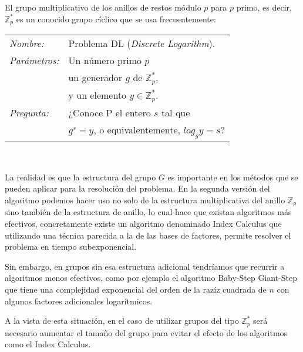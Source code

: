 \hfil

El grupo multiplicativo de los anillos de restos m\'odulo $p$ para $p$ primo, es decir, ${\mathbb Z}^*_p$ es un conocido grupo c\'iclico que se usa frecuentemente:

\hfil

\begin{tabular}{|ll}
	\textit{Nombre:} & Problema DL (\textit{Discrete Logarithm}). \\
	\textit{Parámetros:} & Un n\'umero primo $p$ \\ & un generador $g$ de ${\mathbb Z}_p^*$,\\ & y un elemento $y\in {\mathbb Z}_p^*$. \\
	\textit{Pregunta:} & ¿Conoce P el entero $s$ tal que \\ & $g^s = y$, o equivalentemente, $log_g y = s$? \\
\end{tabular}
\\

\hfil

La realidad es que la estructura del grupo $G$ es importante en los m\'etodos que se pueden aplicar para la resoluci\'on del problema. En la segunda versi\'on del algoritmo
podemos hacer uso no solo de la estructura multiplicativa del anillo ${\mathbb Z}_p$ sino tambi\'en de la estructura de anillo, lo cual hace que existan algoritmos m\'as efectivos,
concretamente existe un algoritmo denominado Index Calculus que utilizando una t\'ecnica parecida a la de las bases de factores, permite resolver el problema en tiempo subexponencial.

Sin embargo, en grupos sin esa estructura adicional tendr\'iamos que recurrir a algoritmos menos efectivos, como por ejemplo el algoritmo Baby-Step Giant-Step que tiene una complejidad
exponencial del orden de la raz\'iz cuadrada de $n$ con algunos factores adicionales logar\'itmicos.

A la vista de esta situaci\'on, en el caso de utilizar grupos del tipo ${\mathbb Z}_p^*$ ser\'a necesario aumentar el tama\~no del grupo para evitar el efecto de los algoritmos
como el Index Calculus.
